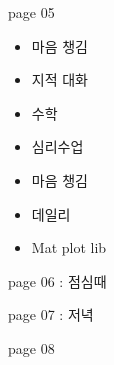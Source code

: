 \documentclass[aspectratio=1610,17pt,xcolor=pdftex,dvipsnames,table,handout]{beamer}
\begin{document}
		\begin{frame} [t,plain]

			\begin{block} { page 05 }

			\begin{itemize}
			\item 	마음 챙김
			\item 	지적 대화
			\item 	수학
			\item 	심리수업
			\item 	마음 챙김
			\item 	데일리
			\item  	Mat plot lib 
			\end{itemize}


			\end{block}			
								
		\end{frame}	 %



		\begin{frame} [t,plain]

			\begin{block} { page 06  :  점심때  }

			\end{block}			
								
		\end{frame}	 %


		\begin{frame} [t,plain]

			\begin{block} { page 07  :   저녁  }

			\end{block}			
								
		\end{frame}	 %


		\begin{frame} [t,plain]

			\begin{block} { page 08 }

			\end{block}			
								
		\end{frame}	 %
\end{document}
